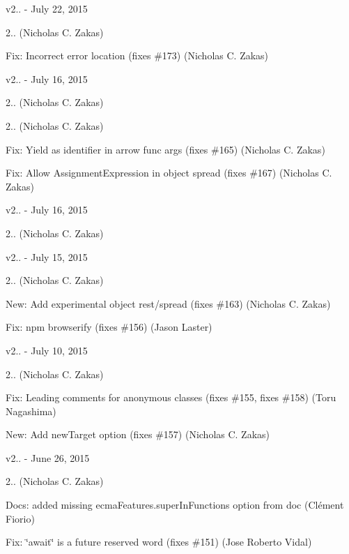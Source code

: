 v2.. -\/ July 22, 2015


\begin{DoxyItemize}
\item 2.. (Nicholas C. Zakas)
\item Fix\+: Incorrect error location (fixes \#173) (Nicholas C. Zakas)
\end{DoxyItemize}

v2.. -\/ July 16, 2015


\begin{DoxyItemize}
\item 2.. (Nicholas C. Zakas)
\item 2.. (Nicholas C. Zakas)
\item Fix\+: Yield as identifier in arrow func args (fixes \#165) (Nicholas C. Zakas)
\item Fix\+: Allow Assignment\+Expression in object spread (fixes \#167) (Nicholas C. Zakas)
\end{DoxyItemize}

v2.. -\/ July 16, 2015


\begin{DoxyItemize}
\item 2.. (Nicholas C. Zakas)
\end{DoxyItemize}

v2.. -\/ July 15, 2015


\begin{DoxyItemize}
\item 2.. (Nicholas C. Zakas)
\item New\+: Add experimental object rest/spread (fixes \#163) (Nicholas C. Zakas)
\item Fix\+: npm browserify (fixes \#156) (Jason Laster)
\end{DoxyItemize}

v2.. -\/ July 10, 2015


\begin{DoxyItemize}
\item 2.. (Nicholas C. Zakas)
\item Fix\+: Leading comments for anonymous classes (fixes \#155, fixes \#158) (Toru Nagashima)
\item New\+: Add new\+Target option (fixes \#157) (Nicholas C. Zakas)
\end{DoxyItemize}

v2.. -\/ June 26, 2015


\begin{DoxyItemize}
\item 2.. (Nicholas C. Zakas)
\item Docs\+: added missing {\ttfamily ecma\+Features.\+super\+In\+Functions} option from doc (Clément Fiorio)
\item Fix\+: \char`\"{}await\char`\"{} is a future reserved word (fixes \#151) (Jose Roberto Vidal)
\end{DoxyItemize}

